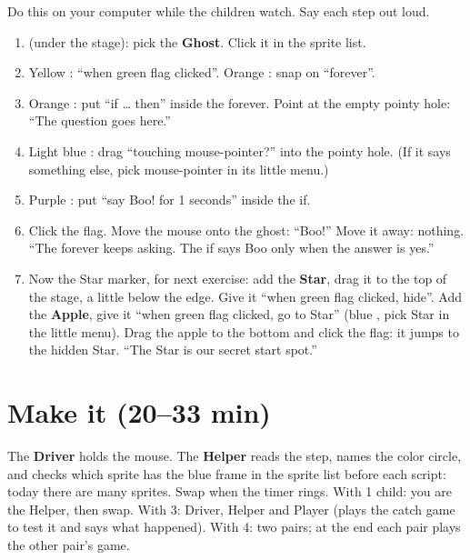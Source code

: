 \begin{workedexample}
Do this on your computer while the children watch. Say each step out loud.
\begin{enumerate}[leftmargin=1.4em,itemsep=1pt]
  \item {} (under the stage): pick the \textbf{Ghost}. Click it in the sprite list.
  \item Yellow : \enquote{when green flag clicked}. Orange : snap on \enquote{forever}.
  \item Orange : put \enquote{if \ldots{} then} inside the forever. Point at the empty pointy hole: \enquote{The question goes here.}
  \item Light blue : drag \enquote{touching mouse-pointer?} into the pointy hole. (If it says something else, pick mouse-pointer in its little menu.)
  \item Purple : put \enquote{say Boo! for 1 seconds} inside the if.
  \item Click the flag. Move the mouse onto the ghost: \enquote{Boo!} Move it away: nothing. \enquote{The forever keeps asking. The if says Boo only when the answer is yes.}
  \item Now the Star marker, for next exercise: add the \textbf{Star}, drag it to the top of the stage, a little below the edge. Give it \enquote{when green flag clicked, hide}. Add the \textbf{Apple}, give it \enquote{when green flag clicked, go to Star} (blue , pick Star in the little menu). Drag the apple to the bottom and click the flag: it jumps to the hidden Star. \enquote{The Star is our secret start spot.}
\end{enumerate}
\begin{center}
\begin{scratch}[scale=0.85]
\end{scratch}
\end{center}
\end{workedexample}

\section{Make it (20--33 min)}
\begin{pairroles}
The \textbf{Driver} holds the mouse. The \textbf{Helper} reads the step, names the color circle, and checks which sprite has the blue frame in the sprite list before each script: today there are many sprites. Swap when the timer rings. With 1 child: you are the Helper, then swap. With 3: Driver, Helper and Player (plays the catch game to test it and says what happened). With 4: two pairs; at the end each pair plays the other pair's game.
\end{pairroles}

